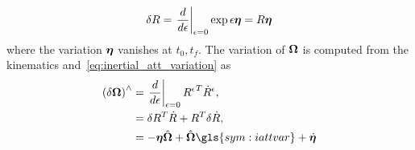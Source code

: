 \begin{align}\label{eq:inertial_att_variation}
    \delta R =  \left.\frac{d }{d \epsilon}\right|_{\epsilon=0} \exp \epsilon \bm{\eta} = R \bm{\eta}
\end{align}
where the variation \( \bm{\eta} \) vanishes at \( t_0, t_f\).
The variation of \( \bm{\Omega} \) is computed from the kinematics and~\cref{eq:inertial_att_variation} as
\begin{align}
    \parenth{\delta \vc{\Omega}}^\wedge  &= \left. \diff{}{\epsilon}\right|_{\epsilon=0} {R^\epsilon}^T \dot{R}^\epsilon, \nonumber \\
                                         &= \delta R^T \dot{R} + R^T \delta \dot{R}, \nonumber \\
                                         &= - \vc{\eta} \vh{\Omega} + \vh{\Omega}\gls{sym:iattvar} + \dot{\vc{\eta}}\label{eq:inertial_ang_vel_variation}
\end{align}

